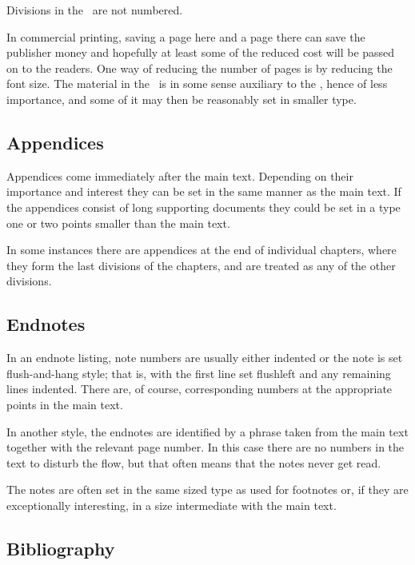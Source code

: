 \documentclass[10pt,letterpaper,extrafontsizes]{memoir}
\begin{document}
    Divisions in the \pixbackmatter\ are not numbered.

    In commercial printing, saving a page here and a page there can save the
publisher money and hopefully at least some of the reduced cost will be passed
on to the readers. One way of reducing the number of pages is by reducing
the font size. The material in the \pixbackmatter\ is in some sense auxiliary 
to the \pixmainmatter, hence of less importance, and some of it may then be 
reasonably set in smaller type.

\subsection{Appendices}

    Appendices come immediately after the main text. Depending
on their importance and interest they can be set in the same manner as the 
main text. If the appendices consist of long supporting documents they could
be set in a type one or two points smaller than the main text.

    In some instances there are appendices at the end of individual chapters,
where they form the last divisions of the chapters, and are treated as any of
the other divisions.

\subsection{Endnotes}

   In an endnote listing, note numbers are usually 
either indented or the note
is set flush-and-hang style; that is, with the 
first line set flushleft and any remaining lines indented. There are, 
of course, corresponding numbers at the appropriate points in the main text.

   In another style, the endnotes are identified by a phrase taken from the 
main text together with the relevant page number. In this case there
are no numbers in the text to disturb the flow, but that often means that the
notes never get read.

    The notes are often set in the same sized type as used for footnotes or,
if they are exceptionally interesting, in a size intermediate with the main 
text.

\subsection{Bibliography}
\end{document}
